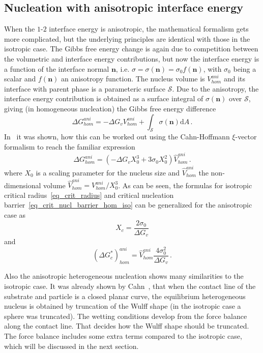     \subsection{Nucleation with anisotropic interface energy}
    When the $\mathit{1}$-$\mathit{2}$ interface energy is anisotropic, the mathematical formalism gets more complicated, but the underlying principles are identical with those in the isotropic case. The Gibbs free energy change is again due to competition between the volumetric and interface energy contributions, but now the interface energy is a function of the interface normal $\bm{n}$, i.e. $\sigma=\sigma(\bm{n})=\sigma_0f(\bm{n})$, with $\sigma_0$ being a scalar and $f(\bm{n})$ an anisotropy function. The nucleus volume is $V_{hom}^{ani}$ and its interface with parent phase is a parameteric surface $\mathcal{S}$. Due to the anisotropy, the interface energy contribution is obtained as a surface integral of $\sigma(\bm{n})$ over $\mathcal{S}$, giving (in homogeneous nucleation) the Gibbs free energy difference
    \begin{equation}
        \Delta G_{hom}^{ani} = -\Delta G_v V_{hom}^{ani} + \int_{\mathcal{S}}\sigma(\bm{n}) \mathrm{d}A \,.
    \end{equation}
    In~\cite{Mariaux2011} it was shown, how this can be worked out using the Cahn-Hoffmann $\xi$-vector formalism to reach the familiar expression
    \begin{equation} \label{eq_DG_hom_aniso}
        \Delta G_{hom}^{ani} = (-\Delta G_v X_0^3 + 3\sigma_0 X_0^2)\hat{V}_{hom}^{ani} \,.
    \end{equation}
    where $X_0$ is a scaling parameter for the nucleus size and $\hat{V}_{hom}^{ani}$ the non-dimensional volume $\hat{V}_{hom}^{ani}=V_{hom}^{ani}/X_0^3$.
    As can be seen, the formulas for isotropic critical radius~\eqref{eq_crit_radius} and critical nucleation barrier~\eqref{eq_crit_nucl_barrier_hom_iso} can be generalized for the anisotropic case as
    \begin{equation}
        X_c=\frac{2\sigma_0}{\Delta G_v}
    \end{equation}
    and
    \begin{equation}
        (\Delta G^*_c)_{hom}^{ani} = \hat{V}_{hom}^{ani}\frac{4\sigma_0^2}{\Delta G_v} \,.
    \end{equation}
    
    Also the anisotropic heterogeneous nucleation shows many similarities to the isotropic case. It was already shown by Cahn~\cite{Cahn1974}, that when the contact line of the substrate and particle is a closed planar curve, the equilibrium heterogeneous nucleus is obtained by truncation of the Wulff shape (in the isotropic case a sphere was truncated). The wetting conditions develop from the force balance along the contact line. That decides how the Wulff shape should be truncated. The force balance includes some extra terms compared to the isotropic case, which will be discussed in the next section.
    
